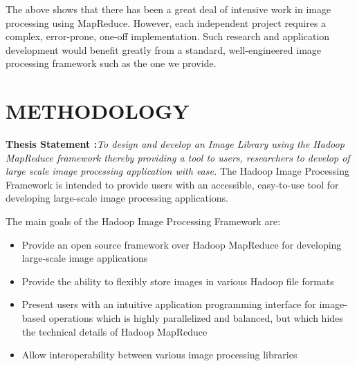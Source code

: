 The above shows that there has been a great deal of intensive work in
image processing using MapReduce.  However, each independent project
requires a complex, error-prone, one-off implementation.  Such
research and application development would benefit greatly from a
standard, well-engineered image processing framework such as the one
we provide.

\chapter{METHODOLOGY}
\textbf{Thesis Statement :}\textit{To design and develop an Image Library using the Hadoop MapReduce framework thereby providing a tool to users, researchers to develop of large scale image processing application with ease.} 
\newline
\newline
The Hadoop Image Processing Framework is intended to provide users
with an accessible, easy-to-use tool for developing large-scale image
processing applications.

The main goals of the Hadoop Image Processing Framework are:
\begin{itemize}
	\item Provide an open source framework over Hadoop MapReduce for
	developing large-scale image applications
	\item Provide the ability to flexibly store images in various Hadoop
	file formats
	\item Present users with an intuitive application programming
	interface for image-based operations which is highly parallelized
	and balanced, but which hides the technical details of Hadoop
	MapReduce
	\item Allow interoperability between various image processing
	libraries
\end{itemize}

